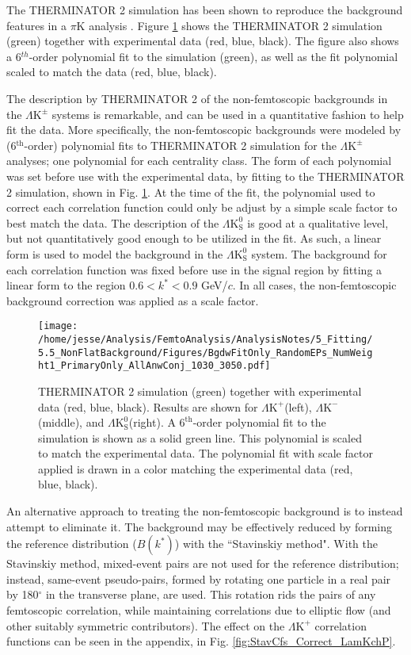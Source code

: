 \documentclass[ALICE,manyauthors]{cernphprep}
\newcommand{\LamKchP}{$\Lambda\mathrm{K^{+}}$\xspace}
\newcommand{\LamKchM}{$\Lambda\mathrm{K^{-}}$\xspace}
\newcommand{\LamKpm}{$\Lambda\mathrm{K^{\pm}}$\xspace}
\newcommand{\LamKs}{$\Lambda\mathrm{K^{0}_{S}}$\xspace}
\begin{document}
The THERMINATOR 2 simulation has been shown to reproduce the background features in a $\pi$K analysis \cite{Kisiel:2017}.  
Figure \ref{fig:BgdswTHERM} shows the THERMINATOR 2 simulation (green) together with experimental data (red, blue, black).  
The figure also shows a 6$^{th}$-order polynomial fit to the simulation (green), as well as the fit polynomial scaled to match the data (red, blue, black).

The description by THERMINATOR 2 of the non-femtoscopic backgrounds in the \LamKpm systems is remarkable, and can be used in a quantitative fashion to help fit the data.
More specifically, the non-femtoscopic backgrounds were modeled by (6$^{\mathrm{th}}$-order) polynomial fits to THERMINATOR 2 simulation for the \LamKpm analyses; one polynomial for each centrality class.
The form of each polynomial was set before use with the experimental data, by fitting to the THERMINATOR 2 simulation, shown in Fig. \ref{fig:BgdswTHERM}.
At the time of the fit, the polynomial used to correct each correlation function could only be adjust by a simple scale factor to best match the data.
The description of the \LamKs is good at a qualitative level, but not quantitatively good enough to be utilized in the fit.
As such, a linear form is used to model the background in the \LamKs system.
The background for each correlation function was fixed before use in the signal region by fitting a linear form to the region $0.6 < k^{*} < 0.9$ GeV/$c$.
In all cases, the non-femtoscopic background correction was applied as a scale factor.

\begin{figure}[h]
  \centering
  \texttt{[image: /home/jesse/Analysis/FemtoAnalysis/AnalysisNotes/5\_Fitting/5.5\_NonFlatBackground/Figures/BgdwFitOnly\_RandomEPs\_NumWeight1\_PrimaryOnly\_AllAnwConj\_1030\_3050.pdf]}
  \caption[Backgrounds with THERMINATOR 2]
  {
  THERMINATOR 2 simulation (green) together with experimental data (red, blue, black).  
  Results are shown for \LamKchP (left), \LamKchM (middle), and \LamKs (right).
  A $6^{\mathrm{th}}$-order polynomial fit to the simulation is shown as a solid green line.  
  This polynomial is scaled to match the experimental data.  
  The polynomial fit with scale factor applied is drawn in a color matching the experimental data (red, blue, black).
  }
  \label{fig:BgdswTHERM}
\end{figure} 


An alternative approach to treating the non-femtoscopic background is to instead attempt to eliminate it.
The background may be effectively reduced by forming the reference distribution ($B(k^{*})$) with the ``Stavinskiy method".
With the Stavinskiy method, mixed-event pairs are not used for the reference distribution; instead, same-event pseudo-pairs, formed by rotating one particle in a real pair by 180$^\circ$ in the transverse plane, are used.  
This rotation rids the pairs of any femtoscopic correlation, while maintaining correlations due to elliptic flow (and other suitably symmetric contributors).
The effect on the \LamKchP correlation functions can be seen in the appendix, in Fig. \ref{fig:StavCfs_Correct_LamKchP}.
\end{document}
